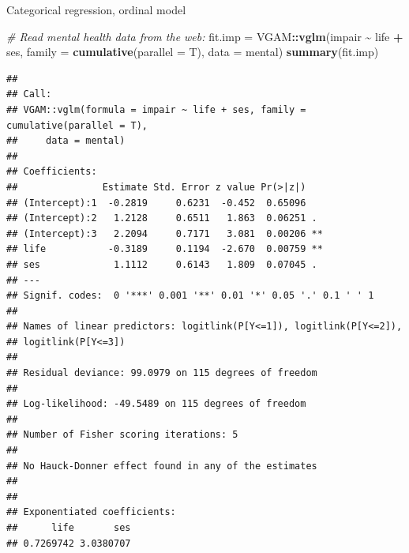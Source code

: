 \documentclass[
  ignorenonframetext,
]{beamer}
\newenvironment{Shaded}{\begin{snugshade}}{\end{snugshade}}
\newcommand{\AttributeTok}[1]{\textcolor[rgb]{0.13,0.29,0.53}{#1}}
\newcommand{\CommentTok}[1]{\textcolor[rgb]{0.56,0.35,0.01}{\textit{#1}}}
\newcommand{\FunctionTok}[1]{\textcolor[rgb]{0.13,0.29,0.53}{\textbf{#1}}}
\newcommand{\NormalTok}[1]{#1}
\newcommand{\OtherTok}[1]{\textcolor[rgb]{0.56,0.35,0.01}{#1}}
\newcommand{\SpecialCharTok}[1]{\textcolor[rgb]{0.81,0.36,0.00}{\textbf{#1}}}
\begin{document}
\begin{frame}[fragile]
\begin{block}{Categorical regression, ordinal model}
\protect\hypertarget{categorical-regression-ordinal-model}{}
\begin{Shaded}
\begin{Highlighting}[]
\CommentTok{\# Read mental health data from the web:}
\NormalTok{fit.imp }\OtherTok{=}\NormalTok{ VGAM}\SpecialCharTok{::}\FunctionTok{vglm}\NormalTok{(impair }\SpecialCharTok{\textasciitilde{}}\NormalTok{ life }\SpecialCharTok{+}\NormalTok{ ses, }\AttributeTok{family =} \FunctionTok{cumulative}\NormalTok{(}\AttributeTok{parallel =}\NormalTok{ T), }\AttributeTok{data =}\NormalTok{ mental)}
\FunctionTok{summary}\NormalTok{(fit.imp)}
\end{Highlighting}
\end{Shaded}

\begin{verbatim}
## 
## Call:
## VGAM::vglm(formula = impair ~ life + ses, family = cumulative(parallel = T), 
##     data = mental)
## 
## Coefficients: 
##               Estimate Std. Error z value Pr(>|z|)   
## (Intercept):1  -0.2819     0.6231  -0.452  0.65096   
## (Intercept):2   1.2128     0.6511   1.863  0.06251 . 
## (Intercept):3   2.2094     0.7171   3.081  0.00206 **
## life           -0.3189     0.1194  -2.670  0.00759 **
## ses             1.1112     0.6143   1.809  0.07045 . 
## ---
## Signif. codes:  0 '***' 0.001 '**' 0.01 '*' 0.05 '.' 0.1 ' ' 1
## 
## Names of linear predictors: logitlink(P[Y<=1]), logitlink(P[Y<=2]), 
## logitlink(P[Y<=3])
## 
## Residual deviance: 99.0979 on 115 degrees of freedom
## 
## Log-likelihood: -49.5489 on 115 degrees of freedom
## 
## Number of Fisher scoring iterations: 5 
## 
## No Hauck-Donner effect found in any of the estimates
## 
## 
## Exponentiated coefficients:
##      life       ses 
## 0.7269742 3.0380707
\end{verbatim}
\end{block}
\end{frame}
\end{document}
